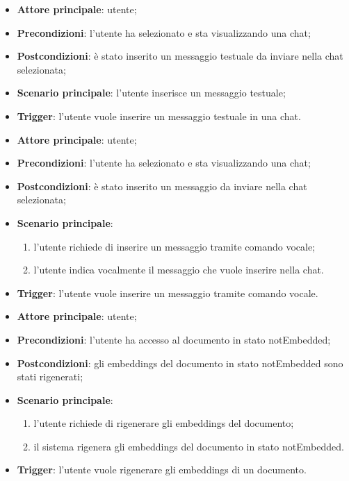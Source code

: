 \documentclass[10pt, a4paper]{article}
\begin{document}
    \begin{itemize}
        \item \textbf{Attore principale}: utente;
        \item \textbf{Precondizioni}: l’utente ha selezionato e sta visualizzando una chat;
        \item \textbf{Postcondizioni}: è stato inserito un messaggio testuale da inviare nella chat selezionata;
        \item \textbf{Scenario principale}: l’utente inserisce un messaggio testuale;
        \item \textbf{Trigger}: l’utente vuole inserire un messaggio testuale in una chat.
    \end{itemize}
    
    \begin{itemize}
        \item \textbf{Attore principale}: utente;
        \item \textbf{Precondizioni}: l’utente ha selezionato e sta visualizzando una chat;
        \item \textbf{Postcondizioni}: è stato inserito un messaggio da inviare nella chat selezionata;
        \item \textbf{Scenario principale}:
            \begin{enumerate}
                \item l’utente richiede di inserire un messaggio tramite comando vocale;
                \item l’utente indica vocalmente il messaggio che vuole inserire nella chat.
            \end{enumerate}
        \item \textbf{Trigger}: l’utente vuole inserire un messaggio tramite comando vocale.
    \end{itemize}

    \begin{itemize}
        \item \textbf{Attore principale}: utente;
        \item \textbf{Precondizioni}: l'utente ha accesso al documento in stato notEmbedded;           
        \item \textbf{Postcondizioni}: gli embeddings del documento in stato notEmbedded sono stati rigenerati;     
        \item \textbf{Scenario principale}: 
            \begin{enumerate}
                \item l'utente richiede di rigenerare gli embeddings del documento;
                \item il sistema rigenera gli embeddings del documento in stato notEmbedded.
            \end{enumerate}
        \item \textbf{Trigger}: l'utente vuole rigenerare gli embeddings di un documento.
    \end{itemize}
\end{document}
